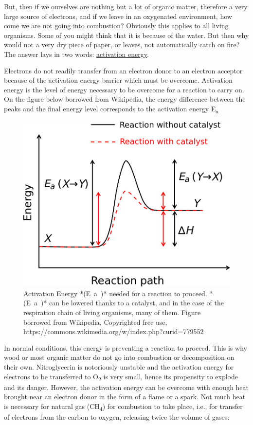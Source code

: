 \documentclass[]{book}
\theoremstyle{definition}
\theoremstyle{definition}
\theoremstyle{definition}
\theoremstyle{remark}
\begin{document}
But, then if we ourselves are nothing but a lot of organic matter,
therefore a very large source of electrons, and if we leave in an
oxygenated environment, how come we are not going into combustion?
Obviously this applies to all living organisms. Some of you might think
that it is because of the water. But then why would not a very dry piece
of paper, or leaves, not automatically catch on fire? The answer lays in
two words:
\href{https://en.wikipedia.org/wiki/Activation_energy}{activation
energy}.

Electrons do not readily transfer from an electron donor to an electron
acceptor because of the activation energy barrier which must be
overcome. Activation energy is the level of energy necessary to be
overcome for a reaction to carry on. On the figure below borrowed from
Wikipedia, the energy difference between the peaks and the final energy
level corresponds to the activation energy E\textsubscript{a}

\begin{figure}

{\centering \includegraphics[width=0.7\linewidth]{pictures/Activation_energy} 

}

\caption{Activation Energy *(E~a~)* needed for a reaction to proceed. *(E~a~)* can be lowered thanks to a catalyst, and in the case of the respiration chain of living organisms, many of them. Figure borrowed from Wikipedia, Copyrighted free use, https://commons.wikimedia.org/w/index.php?curid=779552}\label{fig:EnergyActivation}
\end{figure}

In normal conditions, this energy is preventing a reaction to proceed.
This is why wood or most organic matter do not go into combustion or
decomposition on their own. Nitroglycerin is notoriously unstable and
the activation energy for electrons to be transferred to
O\textsubscript{2} is very small, hence its propensity to explode and
its danger. However, the activation energy can be overcome with enough
heat brought near an electron donor in the form of a flame or a spark.
Not much heat is necessary for natural gas (CH\textsubscript{4}) for
combustion to take place, i.e., for transfer of electrons from the
carbon to oxygen, releasing twice the volume of gases:
\end{document}
